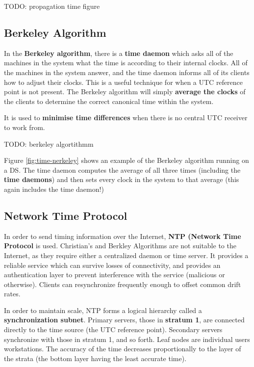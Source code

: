 \documentclass{article}
\begin{document}
TODO: propagation time figure

\subsection{Berkeley Algorithm}

In the \textbf{Berkeley algorithm}, there is a \textbf{time daemon} which asks all of the machines in the system what the time is according to their internal clocks. All of the machines in the system answer, and the time daemon informs all of its clients how to adjust their clocks. This is a useful technique for when a UTC reference point is not present. The Berkeley algorithm will simply \textbf{average the clocks} of the clients to determine the correct canonical time within the system.

It is used to \textbf{minimise time differences} when there is no central UTC receiver to work from.

TODO: berkeley algortithmm

Figure \ref{fig:time-nerkeley} shows an example of the Berkeley algorithm running on a DS. The time daemon computes the average of all three times (including the \textbf{time daemons}) and then sets every clock in the system to that average (this again includes the time daemon!)

\subsection{Network Time Protocol}

In order to send timing information over the Internet, \textbf{NTP (Network Time Protocol} is used. Christian's and Berkley Algorithms are not suitable to the Internet, as they require either a centralized daemon or time server. It provides a reliable service which can survive losses of connectivity, and provides an authentication layer to prevent interference with the service (malicious or otherwise). Clients can resynchronize frequently enough to offset common drift rates.

In order to maintain scale, NTP forms a logical hierarchy called a \textbf{synchronization subnet}. Primary servers, those in \textbf{stratum 1}, are connected directly to the time source (the UTC reference point). Secondary servers synchronize with those in stratum 1, and so forth. Leaf nodes are individual users workstations. The accuracy of the time decreases proportionally to the layer of the strata (the bottom layer having the least accurate time). 
\end{document}

